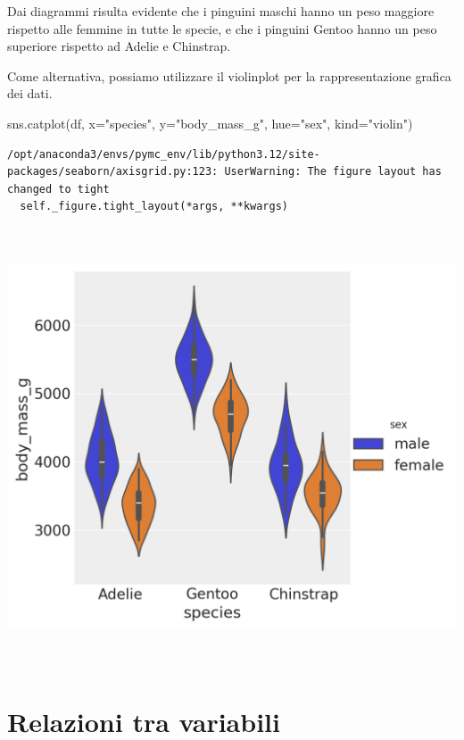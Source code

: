 \documentclass[
  letterpaper,
  krantz2]{{[}./krantz{]}}
\newenvironment{Shaded}{\begin{snugshade}}{\end{snugshade}}
\newcommand{\NormalTok}[1]{\textcolor[rgb]{0.00,0.23,0.31}{#1}}
\newcommand{\OperatorTok}[1]{\textcolor[rgb]{0.37,0.37,0.37}{#1}}
\newcommand{\StringTok}[1]{\textcolor[rgb]{0.13,0.47,0.30}{#1}}
\begin{document}
Dai diagrammi risulta evidente che i pinguini maschi hanno un peso
maggiore rispetto alle femmine in tutte le specie, e che i pinguini
Gentoo hanno un peso superiore rispetto ad Adelie e Chinstrap.

Come alternativa, possiamo utilizzare il violinplot per la
rappresentazione grafica dei dati.

\begin{Shaded}
\begin{Highlighting}[]
\NormalTok{sns.catplot(df, x}\OperatorTok{=}\StringTok{"species"}\NormalTok{, y}\OperatorTok{=}\StringTok{"body\_mass\_g"}\NormalTok{, hue}\OperatorTok{=}\StringTok{"sex"}\NormalTok{, kind}\OperatorTok{=}\StringTok{"violin"}\NormalTok{)}
\end{Highlighting}
\end{Shaded}

\begin{verbatim}
/opt/anaconda3/envs/pymc_env/lib/python3.12/site-packages/seaborn/axisgrid.py:123: UserWarning: The figure layout has changed to tight
  self._figure.tight_layout(*args, **kwargs)
\end{verbatim}

\includegraphics[width=6.30208in,height=5.10417in]{chapters/python/08_seaborn_files/figure-pdf/cell-8-output-2.png}

\section{Relazioni tra variabili}\label{relazioni-tra-variabili}
\end{document}
